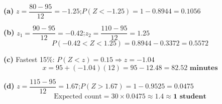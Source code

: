\documentclass[addpoints]{exam}
\begin{document}
\begin{questions}
\begin{solution}[9cm]
\textbf{(a)} $z = \dfrac{80-95}{12} = -1.25$;\quad $P(Z<-1.25) = 1 - 0.8944 = \mathbf{0.1056}$

\textbf{(b)} $z_1 = \dfrac{90-95}{12} = -0.42$;\quad $z_2 = \dfrac{110-95}{12} = 1.25$
\[
P(-0.42 < Z < 1.25) = 0.8944 - 0.3372 = \mathbf{0.5572}
\]

\textbf{(c)} Fastest 15\%: $P(Z < z) = 0.15 \Rightarrow z = -1.04$
\[
x = 95 + (-1.04)(12) = 95 - 12.48 = \mathbf{82.52 \text{ minutes}}
\]

\textbf{(d)} $z = \dfrac{115-95}{12} = 1.67$;\quad $P(Z>1.67) = 1 - 0.9525 = 0.0475$
\[
\text{Expected count} = 30 \times 0.0475 \approx \mathbf{1.4 \approx 1 \text{ student}}
\]
\end{solution}

\end{questions}
\end{document}

